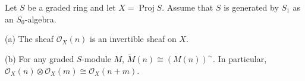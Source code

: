Let $S$ be a graded ring and let $X = \operatorname{Proj} S$. Assume that $S$ is generated by $S_1$ as an $S_0$-algebra.

(a) The sheaf $\mathcal{O}_X(n)$ is an invertible sheaf on $X$.

(b) For any graded $S$-module $M$, $\tilde{M}(n) \cong (M(n))^{\sim}$. In particular, $\mathcal{O}_X(n) \otimes \mathcal{O}_X(m) \cong \mathcal{O}_X(n + m)$.
